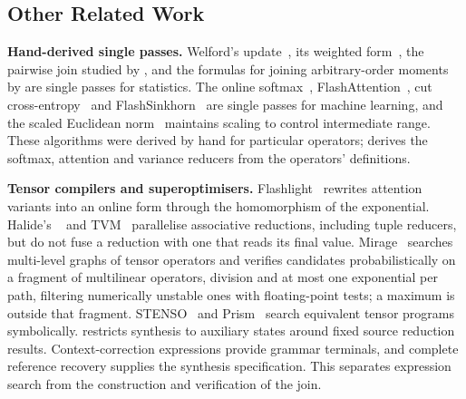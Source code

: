 \subsection{Other Related Work}

\textbf{Hand-derived single passes.}
Welford's update~\citep{welford}, its weighted form~\citep{west}, the pairwise join studied by \citet{chan}, and the formulas for joining arbitrary-order moments by \citet{pebay} are single passes for statistics.
The online softmax~\citep{milakov}, FlashAttention~\citep{flashattention,flashattention2}, cut cross-entropy~\citep{cce} and FlashSinkhorn~\citep{flashsinkhorn} are single passes for machine learning, and the scaled Euclidean norm~\citep{blue} maintains scaling to control intermediate range.
These algorithms were derived by hand for particular operators; \sys derives the softmax, attention and variance reducers from the operators' definitions.

\textbf{Tensor compilers and superoptimisers.}
Flashlight~\citep{flashlight} rewrites attention variants into an online form through the homomorphism of the exponential.
Halide's ~\citep{rfactor} and TVM~\citep{tvm,tensorir} parallelise associative reductions, including tuple reducers, but do not fuse a reduction with one that reads its final value.
Mirage~\citep{mirage} searches multi-level graphs of tensor operators and verifies candidates probabilistically on a fragment of multilinear operators, division and at most one exponential per path, filtering numerically unstable ones with floating-point tests; a maximum is outside that fragment.
STENSO~\citep{stenso} and Prism~\citep{prism} search equivalent tensor programs symbolically.
\sys restricts synthesis to auxiliary states around fixed source reduction results.
Context-correction expressions provide grammar terminals, and complete reference recovery supplies the synthesis specification.
This separates expression search from the construction and verification of the join.


